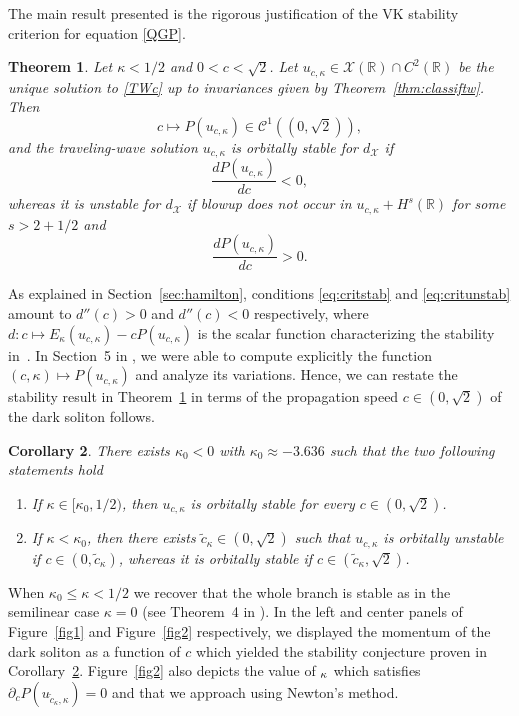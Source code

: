 \documentclass[11pt]{article}
\newcommand{\R}{\mathbb{R}}
\newcommand{\boC}{\mathcal{C}}
\theoremstyle{plain}
\newtheorem{theorem}{Theorem}[section]
\newtheorem{corollary}[theorem]{Corollary}
\theoremstyle{definition}
\theoremstyle{remark}
\numberwithin{equation}{section}
\begin{document}
{	
	The main result presented is the rigorous justification of the VK stability criterion for equation \eqref{QGP}.
	\begin{theorem}\label{thm:critstab}
		Let $\kappa<1/2$ and $0 <c<\sqrt{2}$. Let $u_{c,\kappa}\in\mathcal{X}(\R)\cap C^2(\R)$ be the unique solution to \eqref{TWc} up to invariances given by Theorem~\ref{thm:classiftw}. Then $$c\mapsto P(u_{c,\kappa})\in\boC^1((0,\sqrt{2})),$$ and the traveling-wave solution $u_{c,\kappa}$ is orbitally  stable for $d_\mathcal{X}$ if \begin{equation}\label{eq:critstab}
			\frac{dP(u_{c,\kappa})}{dc}<0,
		\end{equation} whereas it is unstable for $d_\mathcal{X}$ if blowup does not occur in $u_{c,\kappa}+ H^{s}(\R)$ for some $s>2+1/2$ and
		\begin{equation}\label{eq:critunstab}
			\frac{dP(u_{c,\kappa})}{dc}>0.
		\end{equation}
	\end{theorem}
	As explained in Section~\ref{sec:hamilton}, conditions \eqref{eq:critstab} and \eqref{eq:critunstab} amount to $d''(c)>0$ and $d''(c)<0$ respectively,
	where $d:c\mapsto E_\kappa(u_{c,\kappa})-cP(u_{c,\kappa})$ is the scalar function characterizing the stability in~\cite{grillakisshatah}.
	In Section~5 in \cite{delaire2023exotic}, we were able to compute explicitly the function $(c,\kappa)\mapsto P(u_{c,\kappa})$ and analyze its variations. Hence, we can restate the stability result in Theorem~\ref{thm:critstab} in terms of the propagation speed $c\in(0,\sqrt2)$ of the dark soliton follows.
	\begin{corollary}\label{cor:stab}
		There exists $\kappa_0<0$ with $\kappa_0\approx-3.636$ such that the two following statements hold
		\begin{enumerate}
			\item If $\kappa \in[\kappa_0,1/2)$, then $u_{c,\kappa}$ is orbitally stable for every $c\in(0,\sqrt{2})$.
			\item If $\kappa<\kappa_0$, then there exists $\tilde{c}_\kappa\in(0,\sqrt 2)$ such that $u_{c,\kappa}$ is orbitally unstable if $c\in(0,\tilde{c}_\kappa)$, whereas it is orbitally stable if $c\in(\tilde{c}_\kappa,\sqrt{2})$.
		\end{enumerate}
	\end{corollary}
	When $\kappa_0\leq\kappa<1/2$ we recover that the whole branch is stable as in the semilinear case $\kappa=0$ (see Theorem~4 in \cite{bethuel2008existence}). In the left and center panels of Figure~\ref{fig1} and Figure~\ref{fig2} respectively, we displayed the momentum of the dark soliton as a function of $c$ which yielded the stability conjecture proven in Corollary~\ref{cor:stab}. Figure~\ref{fig2} also depicts the value of $\title{c}_\kappa$ which satisfies $\partial_cP(u_{\tilde{c}_\kappa,\kappa})=0$ and that we approach using Newton's method.
}
\end{document}

